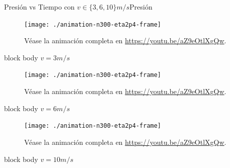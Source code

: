\documentclass{beamer}
\begin{document}
            \begin{frame}{Presión vs Tiempo con $v \in \{ 3, 6, 10\}m/s$}{Presión}
                \begin{minipage}[t]{0.3\textwidth}
                    \begin{figure}[H!]
                        \texttt{[image: ./animation-n300-eta2p4-frame]}
                        \caption*{Véase la animación completa en \url{https://youtu.be/aZ9eOtlXgQw}.}
                        \label{fig:p_vs_t_3ms}
                    \end{figure}
                    \begin{beamercolorbox}[sep=5pt,center]{block body}
                        \centering
                        \small{$v=3m/s$}
                    \end{beamercolorbox}
                \end{minipage}
                \hfill
                \begin{minipage}[t]{0.30\textwidth}
                    \begin{figure}[H!]
                        \texttt{[image: ./animation-n300-eta2p4-frame]}
                        \caption*{Véase la animación completa en \url{https://youtu.be/aZ9eOtlXgQw}.}
                        \label{fig:p_vs_t_6ms}
                    \end{figure}
                    \begin{beamercolorbox}[sep=5pt,center]{block body}
                        \centering
                        \small{$v=6m/s$}
                    \end{beamercolorbox}
                \end{minipage}
                \hfill
                \begin{minipage}[t]{0.30\textwidth}
                    \begin{figure}[H!]
                        \texttt{[image: ./animation-n300-eta2p4-frame]}
                        \caption*{Véase la animación completa en \url{https://youtu.be/aZ9eOtlXgQw}.}
                        \label{fig:p_vs_t_10ms}
                    \end{figure}
                    \begin{beamercolorbox}[sep=5pt,center]{block body}
                        \centering
                        \small{$v=10m/s$}
                    \end{beamercolorbox}
                \end{minipage}
            \end{frame}
\end{document}

